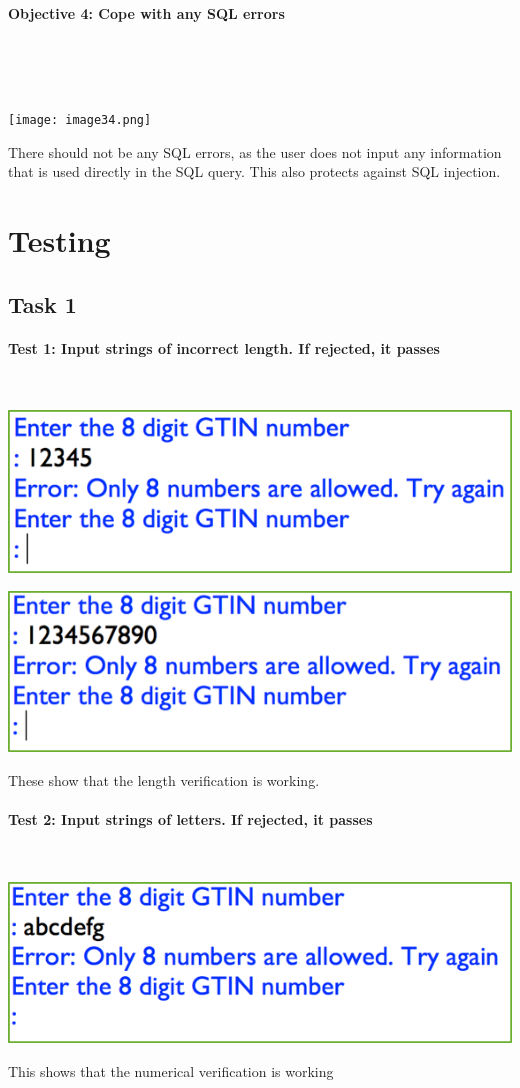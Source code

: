 \documentclass[a4paper]{article}
\begin{document}
\paragraph{Objective 4: Cope with any SQL errors} ~\par ~\par
\noindent\texttt{[image: image34.png]} \par 
There should not be any SQL errors, as the user does not input any information that is used directly in the SQL query. This also protects against SQL injection.

\newpage

\section{Testing}
\subsection{Task 1}
\paragraph{Test 1: Input strings of incorrect length. If rejected, it passes} ~\par
\noindent\includegraphics{testing_1.png} \par 
\noindent\includegraphics{testing_2.png} \par 
These show that the length verification is working.
\paragraph{Test 2: Input strings of letters. If rejected, it passes} ~\par 
\noindent\includegraphics{testing_3.png} \par 
This shows that the numerical verification is working
\end{document}
